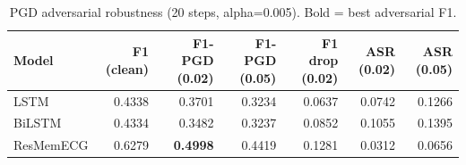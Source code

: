 \begin{table}[h!]
\centering
\caption{PGD adversarial robustness (20 steps, alpha=0.005). Bold = best adversarial F1.}
\label{tab:pgd_robust}
\begin{tabular}{lrrrrrr}
\toprule
Model & F1 (clean) & F1-PGD (0.02) & F1-PGD (0.05) & F1 drop (0.02) & ASR (0.02) & ASR (0.05) \\
\midrule
LSTM & 0.4338 & 0.3701 & 0.3234 & 0.0637 & 0.0742 & 0.1266 \\
BiLSTM & 0.4334 & 0.3482 & 0.3237 & 0.0852 & 0.1055 & 0.1395 \\
ResMemECG & 0.6279 & \textbf{0.4998} & 0.4419 & 0.1281 & 0.0312 & 0.0656 \\
\bottomrule
\end{tabular}
\end{table}